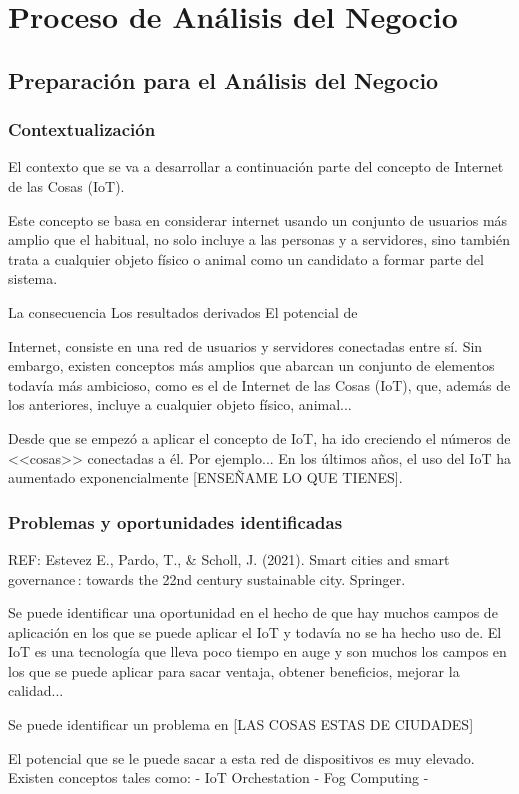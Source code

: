 \documentclass[12pt, a4paper, twoside]{article}
\begin{document}


\newpage

\tableofcontents

\section{Proceso de Análisis del Negocio}
\subsection{Preparación para el Análisis del Negocio}
\subsubsection{Contextualización}
El contexto que se va a desarrollar a continuación parte del concepto de Internet de las Cosas (IoT).

Este concepto se basa en considerar internet usando un conjunto de usuarios más amplio que el 
habitual, no solo incluye a las personas y a servidores, sino también trata a cualquier objeto 
físico o animal como un candidato a formar parte del sistema.

La consecuencia
Los resultados derivados
El potencial de

Internet, consiste en una red de usuarios y servidores conectadas entre sí.
Sin embargo, existen conceptos más amplios que abarcan un conjunto de elementos todavía más ambicioso,
como es el de Internet de las Cosas (IoT), que, además de los anteriores, incluye a cualquier objeto físico,
 animal...

Desde que se empezó a aplicar el concepto de IoT, ha ido creciendo el números de <<cosas>> conectadas a él. 
Por ejemplo...
En los últimos años, el uso del IoT ha aumentado exponencialmente [ENSEÑAME LO QUE TIENES].
\subsubsection{Problemas y oportunidades identificadas}
REF: 
Estevez E., Pardo, T., & Scholl, J. (2021). Smart cities and smart governance : towards the 22nd century sustainable city. Springer.



Se puede identificar una oportunidad en el hecho de que hay muchos campos de aplicación en los que se
puede aplicar el IoT y todavía no se ha hecho uso de.
El IoT es una tecnología que lleva poco tiempo en auge y son muchos los campos en los que se puede 
aplicar para sacar ventaja, obtener beneficios, mejorar la calidad...

Se puede identificar un problema en [LAS COSAS ESTAS DE CIUDADES]

El potencial que se le puede sacar a esta red de dispositivos es muy elevado. Existen conceptos tales como:
 - IoT Orchestation
 - Fog Computing
 - 
\end{document}
